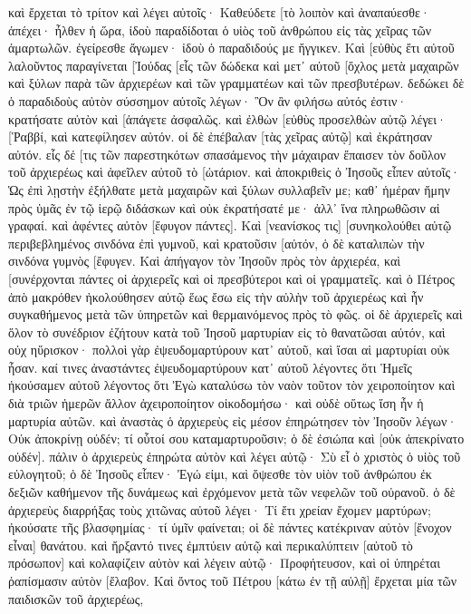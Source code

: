 καὶ ἔρχεται τὸ τρίτον καὶ λέγει αὐτοῖς· Καθεύδετε [τὸ λοιπὸν καὶ ἀναπαύεσθε· ἀπέχει· ἦλθεν ἡ ὥρα, ἰδοὺ παραδίδοται ὁ υἱὸς τοῦ ἀνθρώπου εἰς τὰς χεῖρας τῶν ἁμαρτωλῶν. 
ἐγείρεσθε ἄγωμεν· ἰδοὺ ὁ παραδιδούς με ἤγγικεν. 
Καὶ [εὐθὺς ἔτι αὐτοῦ λαλοῦντος παραγίνεται [Ἰούδας [εἷς τῶν δώδεκα καὶ μετ᾽ αὐτοῦ [ὄχλος μετὰ μαχαιρῶν καὶ ξύλων παρὰ τῶν ἀρχιερέων καὶ τῶν γραμματέων καὶ τῶν πρεσβυτέρων. 
δεδώκει δὲ ὁ παραδιδοὺς αὐτὸν σύσσημον αὐτοῖς λέγων· Ὃν ἂν φιλήσω αὐτός ἐστιν· κρατήσατε αὐτὸν καὶ [ἀπάγετε ἀσφαλῶς. 
καὶ ἐλθὼν [εὐθὺς προσελθὼν αὐτῷ λέγει· [Ῥαββί, καὶ κατεφίλησεν αὐτόν. 
οἱ δὲ ἐπέβαλαν [τὰς χεῖρας αὐτῷ] καὶ ἐκράτησαν αὐτόν. 
εἷς δέ [τις τῶν παρεστηκότων σπασάμενος τὴν μάχαιραν ἔπαισεν τὸν δοῦλον τοῦ ἀρχιερέως καὶ ἀφεῖλεν αὐτοῦ τὸ [ὠτάριον. 
καὶ ἀποκριθεὶς ὁ Ἰησοῦς εἶπεν αὐτοῖς· Ὡς ἐπὶ λῃστὴν ἐξήλθατε μετὰ μαχαιρῶν καὶ ξύλων συλλαβεῖν με; 
καθ᾽ ἡμέραν ἤμην πρὸς ὑμᾶς ἐν τῷ ἱερῷ διδάσκων καὶ οὐκ ἐκρατήσατέ με· ἀλλ᾽ ἵνα πληρωθῶσιν αἱ γραφαί. 
καὶ ἀφέντες αὐτὸν [ἔφυγον πάντες]. 
Καὶ [νεανίσκος τις] [συνηκολούθει αὐτῷ περιβεβλημένος σινδόνα ἐπὶ γυμνοῦ, καὶ κρατοῦσιν [αὐτόν, 
ὁ δὲ καταλιπὼν τὴν σινδόνα γυμνὸς [ἔφυγεν. 
Καὶ ἀπήγαγον τὸν Ἰησοῦν πρὸς τὸν ἀρχιερέα, καὶ [συνέρχονται πάντες οἱ ἀρχιερεῖς καὶ οἱ πρεσβύτεροι καὶ οἱ γραμματεῖς. 
καὶ ὁ Πέτρος ἀπὸ μακρόθεν ἠκολούθησεν αὐτῷ ἕως ἔσω εἰς τὴν αὐλὴν τοῦ ἀρχιερέως καὶ ἦν συγκαθήμενος μετὰ τῶν ὑπηρετῶν καὶ θερμαινόμενος πρὸς τὸ φῶς. 
οἱ δὲ ἀρχιερεῖς καὶ ὅλον τὸ συνέδριον ἐζήτουν κατὰ τοῦ Ἰησοῦ μαρτυρίαν εἰς τὸ θανατῶσαι αὐτόν, καὶ οὐχ ηὕρισκον· 
πολλοὶ γὰρ ἐψευδομαρτύρουν κατ᾽ αὐτοῦ, καὶ ἴσαι αἱ μαρτυρίαι οὐκ ἦσαν. 
καί τινες ἀναστάντες ἐψευδομαρτύρουν κατ᾽ αὐτοῦ λέγοντες 
ὅτι Ἡμεῖς ἠκούσαμεν αὐτοῦ λέγοντος ὅτι Ἐγὼ καταλύσω τὸν ναὸν τοῦτον τὸν χειροποίητον καὶ διὰ τριῶν ἡμερῶν ἄλλον ἀχειροποίητον οἰκοδομήσω· 
καὶ οὐδὲ οὕτως ἴση ἦν ἡ μαρτυρία αὐτῶν. 
καὶ ἀναστὰς ὁ ἀρχιερεὺς εἰς μέσον ἐπηρώτησεν τὸν Ἰησοῦν λέγων· Οὐκ ἀποκρίνῃ οὐδέν; τί οὗτοί σου καταμαρτυροῦσιν; 
ὁ δὲ ἐσιώπα καὶ [οὐκ ἀπεκρίνατο οὐδέν]. πάλιν ὁ ἀρχιερεὺς ἐπηρώτα αὐτὸν καὶ λέγει αὐτῷ· Σὺ εἶ ὁ χριστὸς ὁ υἱὸς τοῦ εὐλογητοῦ; 
ὁ δὲ Ἰησοῦς εἶπεν· Ἐγώ εἰμι, καὶ ὄψεσθε τὸν υἱὸν τοῦ ἀνθρώπου ἐκ δεξιῶν καθήμενον τῆς δυνάμεως καὶ ἐρχόμενον μετὰ τῶν νεφελῶν τοῦ οὐρανοῦ. 
ὁ δὲ ἀρχιερεὺς διαρρήξας τοὺς χιτῶνας αὐτοῦ λέγει· Τί ἔτι χρείαν ἔχομεν μαρτύρων; 
ἠκούσατε τῆς βλασφημίας· τί ὑμῖν φαίνεται; οἱ δὲ πάντες κατέκριναν αὐτὸν [ἔνοχον εἶναι] θανάτου. 
καὶ ἤρξαντό τινες ἐμπτύειν αὐτῷ καὶ περικαλύπτειν [αὐτοῦ τὸ πρόσωπον] καὶ κολαφίζειν αὐτὸν καὶ λέγειν αὐτῷ· Προφήτευσον, καὶ οἱ ὑπηρέται ῥαπίσμασιν αὐτὸν [ἔλαβον. 
Καὶ ὄντος τοῦ Πέτρου [κάτω ἐν τῇ αὐλῇ] ἔρχεται μία τῶν παιδισκῶν τοῦ ἀρχιερέως, 
